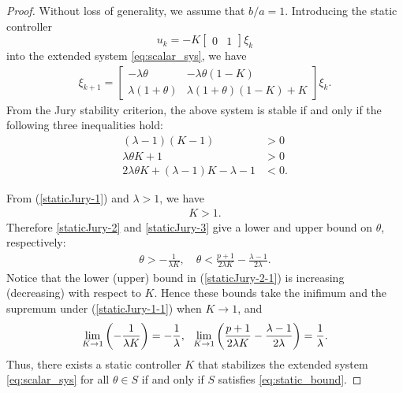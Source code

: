 \documentclass[letterpaper, 12pt, draftcls, onecolumn]{ieeeconf}
\begin{document}
\begin{proof}
	Without loss of generality, we assume that $b/a = 1$.
	Introducing the static controller
	\[
	u_k=-K
	\begin{bmatrix}
	0 & 1
	\end{bmatrix}
	\xi_k
	\]
	into the extended system \eqref{eq:scalar_sys}, we have
	\begin{align}
	\xi_{k+1}=\left[
	\begin{array}{cc}
	-\lambda \theta & - \lambda\theta(1-K)\\
	\lambda (1+\theta) &  \lambda (1+\theta)(1-K)+K
	\end{array}\right]\xi_k.\label{extsys_static}
	\end{align}
	From the Jury stability criterion, the above system is stable if and only
	if the following three inequalities hold:
	\begin{align}
	(\lambda-1)(K-1) &>0\label{staticJury-1}\\
	\lambda\theta K+1 &>0\label{staticJury-2}\\
	2\lambda\theta K+(\lambda-1)K-\lambda-1 &<0\label{staticJury-3}.
	\end{align}
	
From (\ref{staticJury-1}) and $\lambda>1$, we have
	\begin{align}
	K>1.\label{staticJury-1-1}
	\end{align}
	Therefore \eqref{staticJury-2}
	and \eqref{staticJury-3} give a lower and upper bound on $\theta$,
	respectively:
	\begin{align}
	\label{staticJury-2-1}
	\theta>-\frac{1}{\lambda K},\quad
	\theta<\frac{p+1}{2\lambda K}-\frac{\lambda-1}{2\lambda}.
	\end{align}
	Notice that the lower (upper)
	bound in (\ref{staticJury-2-1}) is increasing (decreasing) with
	respect to $K$.
Hence these bounds take the inifimum and the supremum under
	(\ref{staticJury-1-1}) when $K \to 1$, and
	\begin{align}
	\lim_{K \to 1}\left(-\frac{1}{\lambda K}\right)
	=-\frac{1}{\lambda},~~
	\lim_{K \to 1}\left(\frac{p+1}{2\lambda K}-
	\frac{\lambda-1}{2\lambda}\right)
	=\frac{1}{\lambda}.\notag
	\end{align}
	Thus,
	there exists a
	static controller $K$ that stabilizes 
	the extended system \eqref{eq:scalar_sys}
	for all
	$\theta\in S$ if and only if $S$ satisfies \eqref{eq:static_bound}.
\end{proof}
\end{document}

